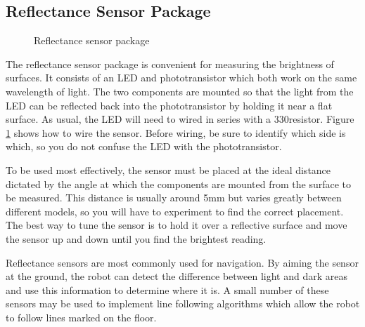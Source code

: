 \subsection{Reflectance Sensor Package}

\begin{figure}[htbp]
 \centerline{}
 \caption{Reflectance sensor package}
 \label{reflect}
\end{figure}

The reflectance sensor package is convenient for measuring the brightness of surfaces. It consists of an LED and phototransistor which both work on the same wavelength of light. The two components are mounted so that the light from the LED can be reflected back into the phototransistor by holding it near a flat surface. As usual, the LED will need to wired in series with a 330\ohm resistor. Figure \ref{reflect} shows how to wire the sensor. Before wiring, be sure to identify which side is which, so you do not confuse the LED with the phototransistor.

To be used most effectively, the sensor must be placed at the ideal distance dictated by the angle at which the components are mounted from the surface to be measured. This distance is usually around 5mm but varies greatly between different models, so you will have to experiment to find the correct placement. The best way to tune the sensor is to hold it over a reflective surface and move the sensor up and down until you find the brightest reading.

Reflectance sensors are most commonly used for navigation. By aiming the sensor at the ground, the robot can detect the difference between light and dark areas and use this information to determine where it is. A small number of these sensors may be used to implement line following algorithms which allow the robot to follow lines marked on the floor.
